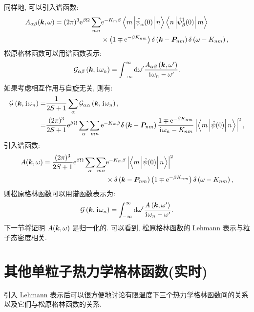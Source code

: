 同样地, 可以引入谱函数:
\begin{align}
A_{\alpha \beta}(\boldsymbol{k}, \omega)=(2 \pi)^3 \mathrm{e}^{\beta \Omega} \sum_{m n}& \mathrm{e}^{-{K}_m \beta}\left\langle m\left|\hat{\psi}^{}_\alpha(0)\right| n\right\rangle\left\langle n\left|\hat{\psi}_\beta^{\dagger}(0)\right| m\right\rangle\nonumber\\
& \times\left(1 \mp \mathrm{e}^{-\beta K_{n m}}\right) \delta\left(\boldsymbol{k}-\boldsymbol{P}_{n m}\right) \delta\left(\omega-K_{n m}\right),
\end{align}
松原格林函数可以用谱函数表示:
\begin{equation}
\mathcal{G}_{\alpha \beta}\left(\boldsymbol{k}, \hspace{0.1em}\mathrm{i}\hspace{0.1em} \omega_n\right)=\int_{-\infty}^{\infty} \mathrm{d} \omega^{\prime} \frac{A_{\alpha \beta}\left(\boldsymbol{k}, \omega^{\prime}\right)}{\hspace{0.1em}\mathrm{i}\hspace{0.1em} \omega_n-\omega^{\prime}} .
\end{equation}
如果考虑相互作用与自旋无关, 则有:
\begin{align}
\mathcal{G}\left(\boldsymbol{k}, \hspace{0.1em}\mathrm{i}\hspace{0.1em} \omega_n\right)=&\frac{1}{2 S+1} \sum_\alpha \mathcal{G}_{\alpha \alpha}\left(\boldsymbol{k}, \hspace{0.1em}\mathrm{i}\hspace{0.1em} \omega_n\right), \nonumber\\
=&\frac{(2 \pi)^3}{2 S+1}\mathrm{e}^{\beta \Omega}\sum_\alpha \sum_{m n} \mathrm{e}^{-{K}_m \beta}\delta\left(\boldsymbol{k}-\boldsymbol{P}_{n m}\right)\frac{1 \mp \mathrm{e}^{-\beta K_{n m}}}{\hspace{0.1em}\mathrm{i}\hspace{0.1em} \omega_n-K_{n m}}\left|\left\langle m\left|\hat{\psi}(0)\right| n\right\rangle\right|^2,
\end{align}
引入谱函数:
\begin{align}
A(\boldsymbol{k}, \omega)=\frac{(2 \pi)^3}{2 S+1}\mathrm{e}^{\beta \Omega}  \sum_\alpha \sum_{m n} &\mathrm{e}^{-{K}_m \beta} \left|\left\langle m\left|\hat{\psi}(0)\right| n\right\rangle\right|^2\nonumber\\
& \times\delta\left(\boldsymbol{k}-\boldsymbol{P}_{n m}\right)\left(1 \mp \mathrm{e}^{-\beta K_{n m}}\right) \delta\left(\omega-K_{n m}\right),
\end{align}
则松原格林函数可以用谱函数表示为:
\begin{equation}
\mathcal{G}\left(\boldsymbol{k}, \hspace{0.1em}\mathrm{i}\hspace{0.1em} \omega_n\right)=\int_{-\infty}^{\infty} \mathrm{d} \omega^{\prime} \frac{A\left(\boldsymbol{k}, \omega^{\prime}\right)}{\hspace{0.1em}\mathrm{i}\hspace{0.1em} \omega_n-\omega^{\prime}} .
\end{equation}
下一节将证明 $A(\boldsymbol{k}, \omega)$ 是归一化的. 可以看到, 松原格林函数的 Lehmann 表示与粒子态密度相关.

\section{其他单粒子热力学格林函数(实时)}
引入 Lehmann 表示后可以很方便地讨论有限温度下三个热力学格林函数间的关系以及它们与松原格林函数的关系. 
